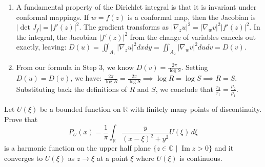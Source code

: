 \begin{solution}
\begin{enumerate}
    \item A fundamental property of the Dirichlet integral is that it is invariant under conformal mappings. If $w = f(z)$ is a conformal map, then the Jacobian is $|\det J_f| = |f'(z)|^2$. The gradient transforms as $|\nabla_z u|^2 = |\nabla_w v|^2 |f'(z)|^2$. In the integral, the Jacobian $|f'(z)|^2$ from the change of variables cancels out exactly, leaving:
    $D(u) = \iint_{A_1} |\nabla_z u|^2 dx dy = \iint_{A_2} |\nabla_w v|^2 du dv = D(v)$.

    \item From our formula in Step 3, we know $D(v) = \frac{2\pi}{\log S}$.
    Setting $D(u) = D(v)$, we have:
    $\frac{2\pi}{\log R} = \frac{2\pi}{\log S} \implies \log R = \log S \implies R = S$.
    Substituting back the definitions of $R$ and $S$, we conclude that $\frac{r_2}{r_1} = \frac{\rho_2}{\rho_1}$.
\end{enumerate}
\end{solution}

\begin{exercise}
\label{analysis:2014:4}
Let $U(\xi)$ be a bounded function on $\mathbb{R}$ with finitely many points of discontinuity. Prove that
\[
P_U(x) = \frac{1}{\pi}\int_{\mathbb{R}} \frac{y}{(x-\xi)^2+y^2}U(\xi)\,d\xi
\]
is a harmonic function on the upper half plane $\{z\in\mathbb{C}\mid \operatorname{Im}z>0\}$ and it converges to $U(\xi)$ as $z\to\xi$ at a point $\xi$ where $U(\xi)$ is continuous.
\end{exercise}

